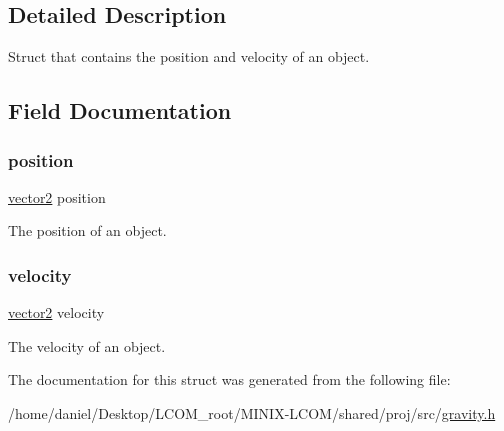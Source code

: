 \subsection{Detailed Description}
Struct that contains the position and velocity of an object. 

\subsection{Field Documentation}
\mbox{\label{structgravity__object_a55d093fd989c09df2b1a0516b8828d31}} 
\subsubsection{\texorpdfstring{position}{position}}
{\footnotesize\ttfamily \hyperlink{structvector2}{vector2} position}



The position of an object. 

\mbox{\label{structgravity__object_ab38e0d342e3fc457159742966beadd5d}} 
\subsubsection{\texorpdfstring{velocity}{velocity}}
{\footnotesize\ttfamily \hyperlink{structvector2}{vector2} velocity}



The velocity of an object. 



The documentation for this struct was generated from the following file\+:\begin{DoxyCompactItemize}
\item 
/home/daniel/\+Desktop/\+L\+C\+O\+M\+\_\+root/\+M\+I\+N\+I\+X-\/\+L\+C\+O\+M/shared/proj/src/\hyperlink{gravity_8h}{gravity.\+h}\end{DoxyCompactItemize}
